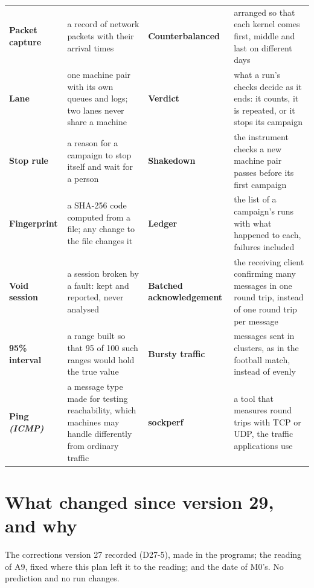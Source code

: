 \documentclass[11pt]{article}
\newcommand{\gl}[1]{{\color{soft}\itshape\small (#1)}}
\begin{document}
{\begin{tabularx}{\linewidth}{@{}>{\bfseries}p{3.1cm} X >{\bfseries}p{3.1cm} X@{}}
Packet capture & a record of network packets with their arrival times & Counterbalanced & arranged so that each kernel comes first, middle and last on different days \\
Lane & one machine pair with its own queues and logs; two lanes never share a machine & Verdict & what a run's checks decide as it ends: it counts, it is repeated, or it stops its campaign \\
Stop rule & a reason for a campaign to stop itself and wait for a person & Shakedown & the instrument checks a new machine pair passes before its first campaign \\
Fingerprint & a SHA-256 code computed from a file; any change to the file changes it & Ledger & the list of a campaign's runs with what happened to each, failures included \\
Void session & a session broken by a fault: kept and reported, never analysed & Batched acknowledgement & the receiving client confirming many messages in one round trip, instead of one round trip per message \\
95\% interval & a range built so that 95 of 100 such ranges would hold the true value & Bursty traffic & messages sent in clusters, as in the football match, instead of evenly \\
Ping \gl{ICMP} & a message type made for testing reachability, which machines may handle differently from ordinary traffic & sockperf & a tool that measures round trips with TCP or UDP, the traffic applications use \\
\end{tabularx}}

\section*{What changed since version 29, and why}
The corrections version 27 recorded (D27-5), made in the programs; the reading of A9, fixed
where this plan left it to the reading; and the date of M0's. No prediction and no run
changes.
\end{document}
